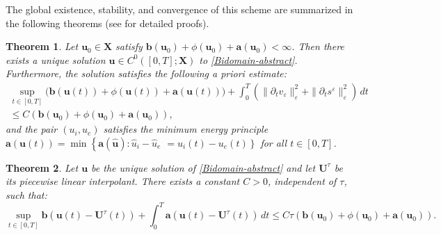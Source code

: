 \documentclass[a4paper,11pt]{article}
\newtheorem{theorem}{Theorem}[section]
\theoremstyle{definition}
\numberwithin{equation}{section}
\newcommand{\e}{\varepsilon}
\begin{document}
The global existence, stability, and convergence of this scheme are summarized in the following theorems (see \cite{PSCF05} for detailed proofs).
\begin{theorem}
	Let $\mathbf{u}_0 \in \mathbf{X}$ satisfy $\mathbf{b}(\mathbf{u}_0) + \phi(\mathbf{u}_0) + \mathbf{a}(\mathbf{u}_0) < \infty$. Then there exists a unique solution $\mathbf{u} \in C^0([0, T]; \mathbf{X})$ to \eqref{Bidomain-abstract}. Furthermore, the solution satisfies the following a priori estimate:
	\begin{equation}
		\label{eq:stability_continuous_refined}
		\begin{aligned}
			\sup_{t \in [0,T]} \Big( \mathbf{b}(\mathbf{u}(t)) + \phi(\mathbf{u}(t)) + \mathbf{a}(\mathbf{u}(t)) \Big) + \int_0^T \left( \|\partial_t v_\e\|_\e^2 + \|\partial_t s^\e\|_\e^2 \right) \,dt &\\ \le C  (\mathbf{b}(\mathbf{u}_0) + \phi(\mathbf{u}_0) + \mathbf{a}(\mathbf{u}_0)),
		\end{aligned}
	\end{equation}
	and the pair $(u_i, u_e)$ satisfies the minimum energy principle $\mathbf{a}(\mathbf{u}(t)) = \min \left\{ \mathbf{a}(\widehat{\mathbf{u}}) : \widehat{u}_i - \widehat{u}_e\right.$ $\left.= u_i(t) - u_e(t) \right\}$ for all $t \in [0,T]$.
\end{theorem}

\begin{theorem}
	Let $\mathbf{u}$ be the unique solution of \eqref{Bidomain-abstract} and let $\mathbf{U}^{\tau}$ be its piecewise linear interpolant. There exists a constant $C > 0$, independent of $\tau$, such that:
	\begin{equation}
		\label{final-error-estimate-bidomain}
		\sup_{t \in [0,T]} \mathbf{b}(\mathbf{u}(t) - \mathbf{U}^{\tau}(t)) + \int_0^T \mathbf{a}(\mathbf{u}(t) - \mathbf{U}^{\tau}(t)) \, dt \le C \tau (\mathbf{b}(\mathbf{u}_0) + \phi(\mathbf{u}_0) + \mathbf{a}(\mathbf{u}_0)).
	\end{equation}
\end{theorem}




\end{document}
